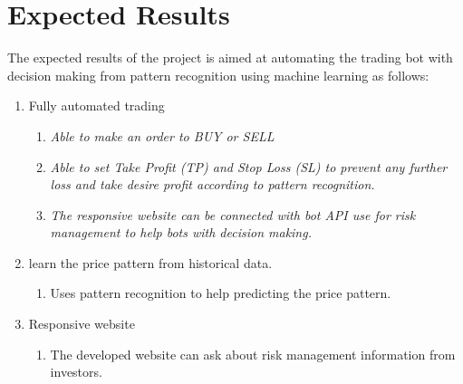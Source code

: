 \section{Expected Results}
The expected results of the project is aimed at  automating the trading bot with decision making from pattern recognition using machine learning as follows:
\begin{enumerate}
	\item Fully automated trading
	\begin{enumerate}
	\item \textit{Able to make an order to BUY or SELL}
	\item \textit{Able to set Take Profit (TP) and Stop Loss (SL) to prevent any further loss
		and take desire profit according to pattern recognition.}
	\item \textit{The responsive website can be connected with bot API use for risk management to help bots with decision making.}
\end{enumerate}
	\item learn the price pattern from historical data.
	\begin{enumerate}
		\item Uses pattern recognition to help predicting the price pattern.
		
	\end{enumerate}
	
	\item Responsive website
	\begin{enumerate}
		\item The developed website can ask about risk management information from investors.
	\end{enumerate}
\end{enumerate}


